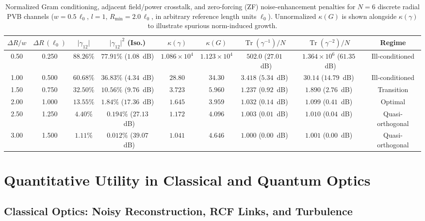 \documentclass[aps,pra,reprint,amsmath,amssymb,floatfix,longbibliography]{revtex4-2}
\providecommand{\abs}[1]{\lvert#1\rvert}
\begin{document}
\begin{table}[t]
\caption{Normalized Gram conditioning, adjacent field/power crosstalk, and zero-forcing (ZF) noise-enhancement penalties for $N = 6$ discrete radial PVB channels ($w = 0.5\,\ell_0$, $l = 1$, $R_{\min} = 2.0\,\ell_0$, in arbitrary reference length units $\ell_0$). Unnormalized $\kappa(G)$ is shown alongside $\kappa(\gamma)$ to illustrate spurious norm-induced growth.}
\label{tab:gram_matrix}
\begin{ruledtabular}
\footnotesize
\setlength{\tabcolsep}{2.5pt}
\begin{tabular}{ccccccccc}
$\Delta R / w$ & $\Delta R\,(\ell_0)$ & $\abs{\gamma_{12}}$ & $\abs{\gamma_{12}}^2$ (Iso.) & $\kappa(\gamma)$ & $\kappa(G)$ & $\operatorname{Tr}(\gamma^{-1})/N$ & $\operatorname{Tr}(\gamma^{-2})/N$ & Regime \\
\hline
0.50 & 0.250 & $88.26\%$ & $77.91\%$ ($1.08$~dB) & $1.086\times 10^4$ & $1.123\times 10^4$ & $502.0$ ($27.01$~dB) & $1.364\times 10^6$ ($61.35$~dB) & Ill-conditioned \\
1.00 & 0.500 & $60.68\%$ & $36.83\%$ ($4.34$~dB) & $28.80$ & $34.30$ & $3.418$ ($5.34$~dB) & $30.14$ ($14.79$~dB) & Ill-conditioned \\
1.50 & 0.750 & $32.50\%$ & $10.56\%$ ($9.76$~dB) & $3.723$ & $5.960$ & $1.237$ ($0.92$~dB) & $1.890$ ($2.76$~dB) & Transition \\
2.00 & 1.000 & $13.55\%$ & $1.84\%$ ($17.36$~dB) & $1.645$ & $3.959$ & $1.032$ ($0.14$~dB) & $1.099$ ($0.41$~dB) & Optimal \\
2.50 & 1.250 & $4.40\%$ & $0.194\%$ ($27.13$~dB) & $1.172$ & $4.096$ & $1.003$ ($0.01$~dB) & $1.010$ ($0.04$~dB) & Quasi-orthogonal \\
3.00 & 1.500 & $1.11\%$ & $0.012\%$ ($39.07$~dB) & $1.041$ & $4.646$ & $1.000$ ($0.00$~dB) & $1.001$ ($0.00$~dB) & Quasi-orthogonal \\
\end{tabular}
\end{ruledtabular}
\end{table}

\section{Quantitative Utility in Classical and Quantum Optics}
\label{sec:optics_utility}

\subsection{Classical Optics: Noisy Reconstruction, RCF Links, and Turbulence}
\label{subsec:classical_utility}
\end{document}
